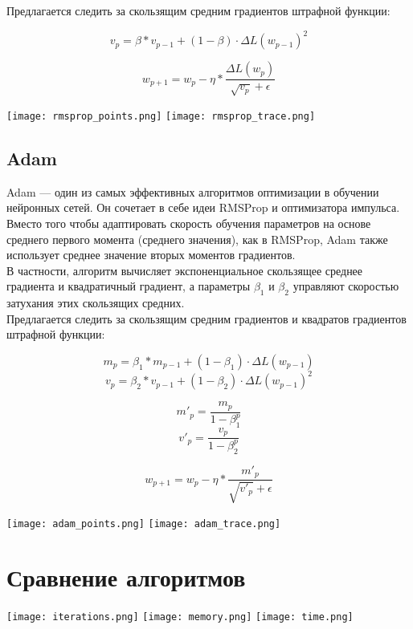\documentclass{article}
\begin{document}
Предлагается следить за скользящим средним градиентов штрафной функции:

$$v_p=\beta * v_{p-1}+(1-\beta)⋅\Delta L(w_{p-1})^2$$

$$w_{p+1}=w_p - \eta*\frac{\Delta L(w_p)}{\sqrt{v_p}+\epsilon}$$

\texttt{[image: rmsprop\_points.png]}
\texttt{[image: rmsprop\_trace.png]}

\subsection{Adam}
Adam — один из самых эффективных алгоритмов оптимизации в обучении нейронных сетей. Он сочетает в себе идеи RMSProp и оптимизатора импульса. Вместо того чтобы адаптировать скорость обучения параметров на основе среднего первого момента (среднего значения), как в RMSProp, Adam также использует среднее значение вторых моментов градиентов. \\
В частности, алгоритм вычисляет экспоненциальное скользящее среднее градиента и квадратичный градиент, а параметры $\beta_1$ и $\beta_2$ управляют скоростью затухания этих скользящих средних.\\

Предлагается следить за скользящим средним градиентов и квадратов градиентов штрафной функции:

$$m_p=\beta_1 * m_{p-1}+(1-\beta_1)⋅\Delta L(w_{p-1})$$
$$v_p=\beta_2 * v_{p-1}+(1-\beta_2)⋅\Delta L(w_{p-1})^2$$

$$m'_p=\frac{m_{p}}{1 - \beta^p_1}$$
$$v'_p=\frac{v_{p}}{1 - \beta^p_2}$$

$$w_{p+1}=w_p - \eta*\frac{m'_p}{\sqrt{v'_p}+\epsilon}$$

\texttt{[image: adam\_points.png]}
\texttt{[image: adam\_trace.png]}

\section{Сравнение алгоритмов}

\texttt{[image: iterations.png]}
\texttt{[image: memory.png]}
\texttt{[image: time.png]}
\end{document}
